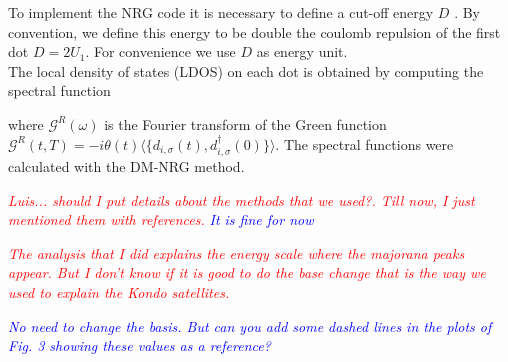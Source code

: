 \documentclass[showpacs,aps,prb,reprint,superscriptaddress]{revtex4-1}
\newcommand{\LUIS}[1]{\textcolor{blue}{\fbox{Luis} {\sl#1}}}
\newcommand{\Jesus}[1]{\textcolor{red}{\fbox{Jesus} {\sl#1}}}
\begin{document}
To implement the NRG code it is necessary to define a cut-off energy $D$ \cite{bulla_numerical_2008}. By convention, we define this energy to be double the coulomb repulsion of the first dot $D = 2U_1$. For convenience we use $D$ as energy unit.  \\



The local density of states (LDOS) on each dot is obtained by computing the spectral function 


%
where $\mathcal{G}^R(\omega)$ is the Fourier transform of the Green function $\mathcal{G}^R(t,T)=-i\theta(t) \langle \{d_{i,\sigma}(t) , d_{i,\sigma}^\dagger(0)\} \rangle$. The spectral functions were calculated with the DM-NRG method.\cite{hofstetter_generalized_2000} 



\Jesus{Luis... should I put details about the methods that we used?. Till now, I just mentioned them with references. }
\LUIS{It is fine for now}






\Jesus{The analysis that I did explains the energy scale where the majorana peaks appear. But I don't know if it is good to do the base change that is the way we used to explain the Kondo satellites. }

\LUIS{No need to change the basis. But can you add some dashed lines in the plots of Fig. 3 showing these values as a reference? }




\end{document}

